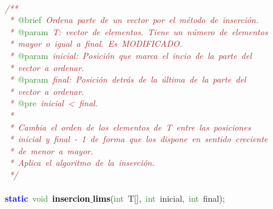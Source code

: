 \mbox{} \\
\mbox{}\textit{\textcolor{Brown}{/**}} \\
\mbox{}\textit{\textcolor{Brown}{\ *\ }}\textcolor{ForestGreen}{@brief}\textit{\textcolor{Brown}{\ Ordena\ parte\ de\ un\ vector\ por\ el\ método\ de\ inserción.}} \\
\mbox{}\textit{\textcolor{Brown}{\ *\ }}\textcolor{ForestGreen}{@param}\textit{\textcolor{Brown}{\ T:\ vector\ de\ elementos.\ Tiene\ un\ número\ de\ elementos\ }} \\
\mbox{}\textit{\textcolor{Brown}{\ *\ mayor\ o\ igual\ a\ final.\ Es\ MODIFICADO.}} \\
\mbox{}\textit{\textcolor{Brown}{\ *\ }}\textcolor{ForestGreen}{@param}\textit{\textcolor{Brown}{\ inicial:\ Posición\ que\ marca\ el\ incio\ de\ la\ parte\ del}} \\
\mbox{}\textit{\textcolor{Brown}{\ *\ vector\ a\ ordenar.}} \\
\mbox{}\textit{\textcolor{Brown}{\ *\ }}\textcolor{ForestGreen}{@param}\textit{\textcolor{Brown}{\ final:\ Posición\ detrás\ de\ la\ última\ de\ la\ parte\ del}} \\
\mbox{}\textit{\textcolor{Brown}{\ *\ vector\ a\ ordenar.\ }} \\
\mbox{}\textit{\textcolor{Brown}{\ *\ }}\textcolor{ForestGreen}{@pre}\textit{\textcolor{Brown}{\ inicial\ \textless{}\ final.}} \\
\mbox{}\textit{\textcolor{Brown}{\ *\ }} \\
\mbox{}\textit{\textcolor{Brown}{\ *\ Cambia\ el\ orden\ de\ los\ elementos\ de\ T\ entre\ las\ posiciones}} \\
\mbox{}\textit{\textcolor{Brown}{\ *\ inicial\ y\ final\ -\ 1\ de\ forma\ que\ los\ dispone\ en\ sentido\ creciente}} \\
\mbox{}\textit{\textcolor{Brown}{\ *\ de\ menor\ a\ mayor.}} \\
\mbox{}\textit{\textcolor{Brown}{\ *\ Aplica\ el\ algoritmo\ de\ la\ inserción.}} \\
\mbox{}\textit{\textcolor{Brown}{\ */}} \\
\mbox{} \\
\mbox{}\textbf{\textcolor{Blue}{static}}\ \textcolor{ForestGreen}{void}\ \textbf{\textcolor{Black}{insercion$\_$lims}}\textcolor{BrickRed}{(}\textcolor{ForestGreen}{int}\ T\textcolor{BrickRed}{[],}\ \textcolor{ForestGreen}{int}\ inicial\textcolor{BrickRed}{,}\ \textcolor{ForestGreen}{int}\ final\textcolor{BrickRed}{);} \\
\mbox{} \\
